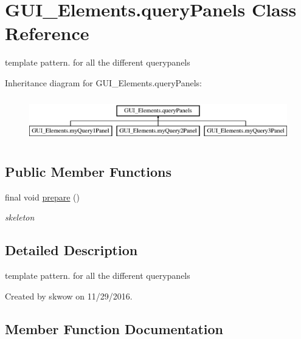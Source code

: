 \hypertarget{class_g_u_i___elements_1_1query_panels}{}\section{G\+U\+I\+\_\+\+Elements.\+query\+Panels Class Reference}
\label{class_g_u_i___elements_1_1query_panels}


template pattern. for all the different querypanels  


Inheritance diagram for G\+U\+I\+\_\+\+Elements.\+query\+Panels\+:\begin{figure}[H]
\begin{center}
\leavevmode
\includegraphics[height=1.944445cm]{class_g_u_i___elements_1_1query_panels}
\end{center}
\end{figure}
\subsection*{Public Member Functions}
\begin{DoxyCompactItemize}
\item 
final void \hyperlink{class_g_u_i___elements_1_1query_panels_accb5dae53ed500cf39ba1ce8833029fc}{prepare} ()
\begin{DoxyCompactList}\small\item\em skeleton \end{DoxyCompactList}\end{DoxyCompactItemize}


\subsection{Detailed Description}
template pattern. for all the different querypanels 

Created by skwow on 11/29/2016. 

\subsection{Member Function Documentation}
\hypertarget{class_g_u_i___elements_1_1query_panels_accb5dae53ed500cf39ba1ce8833029fc}{}\label{class_g_u_i___elements_1_1query_panels_accb5dae53ed500cf39ba1ce8833029fc} 
